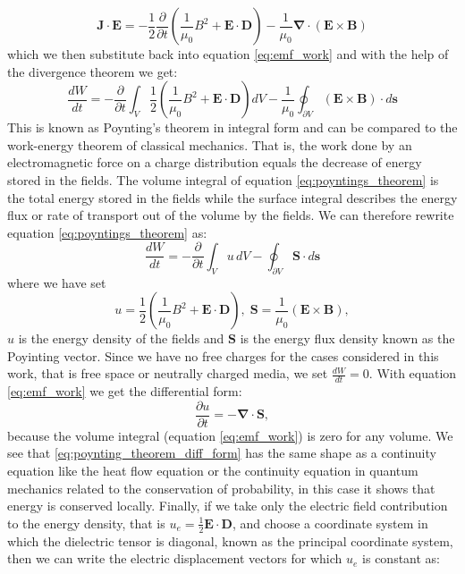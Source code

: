 \begin{equation}
    \bm{J}\cdot\bm{E} = -\frac{1}{2}\frac{\partial}{\partial t}\left(\frac{1}{\mu_0}B^2+\bm{E}\cdot\bm{D}\right)-\frac{1}{\mu_0}\bm{\nabla}\cdot(\bm{E}\times\bm{B})
\end{equation}
which we then substitute back into equation \ref{eq:emf_work} and with the help of the divergence theorem we get:
\begin{equation}
    \label{eq:poyntings_theorem}
    \frac{dW}{dt} = -\frac{\partial}{\partial t} \int_V \frac{1}{2}\left(\frac{1}{\mu_0}B^2+\bm{E}\cdot\bm{D}\right)dV -\frac{1}{\mu_0}\oint_{\partial V} (\bm{E}\times\bm{B}) \cdot d\bm{s}
\end{equation}
This is known as Poynting's theorem in integral form and can be compared to the work-energy theorem of classical mechanics. That is, the work done by an electromagnetic force on a charge distribution equals the decrease of energy stored in the fields. The volume integral of equation \ref{eq:poyntings_theorem} is the total energy stored in the fields while the surface integral describes the energy flux or rate of transport out of the volume by the fields. We can therefore rewrite equation \ref{eq:poyntings_theorem} as:
\begin{equation}
    \frac{dW}{dt} = -\frac{\partial}{\partial t} \int_V u\, dV -\oint_{\partial V} \bm{S} \cdot d\bm{s}
\end{equation}
where we have set
\begin{equation}
    u = \frac{1}{2}\left(\frac{1}{\mu_0}B^2+\bm{E}\cdot\bm{D}\right),\; \bm{S} = \frac{1}{\mu_0}(\bm{E}\times\bm{B}),
\end{equation}
$u$ is the energy density of the fields and $\bm{S}$ is the energy flux density known as the Poyinting vector. Since we have no free charges for the cases considered in this work, that is free space or neutrally charged media, we set $\frac{dW}{dt}=0$. With equation \ref{eq:emf_work} we get the differential form:
\begin{equation}
    \label{eq:poynting_theorem_diff_form}
    \frac{\partial u}{\partial t} = -\bm{\nabla} \cdot \bm{S},
\end{equation}
because the volume integral (equation \ref{eq:emf_work}) is zero for any volume. We see that \ref{eq:poynting_theorem_diff_form} has the same shape as a continuity equation like the heat flow equation or the continuity equation in quantum mechanics related to the conservation of probability, in this case it shows that energy is conserved locally. Finally, if we take only the electric field contribution to the energy density, that is $u_e = \frac{1}{2}\bm{E}\cdot\bm{D}$, and choose a coordinate system in which the dielectric tensor is diagonal, known as the principal coordinate system, then we can write the electric displacement vectors for which $u_e$ is constant as:
